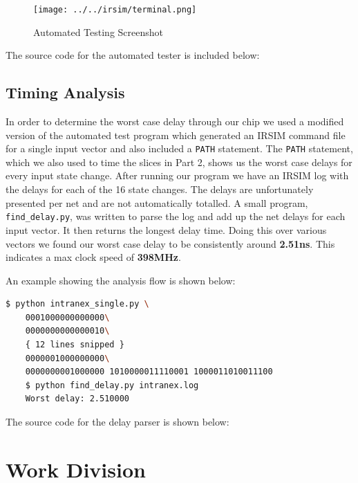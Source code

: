     \begin{figure}[H]
        \centering
        \texttt{[image: ../../irsim/terminal.png]}
        \caption{Automated Testing Screenshot}
    \end{figure}

    \newpage
    The source code for the automated tester is included below:

    

    \newpage
    \subsection{Timing Analysis}

    In order to determine the worst case delay through our chip we used a
    modified version of the automated test program which generated an IRSIM
    command file for a single input vector and also included a \texttt{PATH}
    statement. The \texttt{PATH} statement, which we also used to time the
    slices in Part 2, shows us the worst case delays for every input state
    change. After running our program we have an IRSIM log with the delays for
    each of the 16 state changes. The delays are unfortunately presented per net
    and are not automatically totalled. A small program, \texttt{find\_delay.py},
    was written to parse the log and add up the net delays for each input vector.
    It then returns the longest delay time. Doing this over various vectors we
    found our worst case delay to be consistently around \textbf{2.51ns}. This
    indicates a max clock speed of \textbf{398MHz}.

    An example showing the analysis flow is shown below:
    \begin{lstlisting}[language=bash]
    $ python intranex_single.py \
    0001000000000000\
    0000000000000010\
    { 12 lines snipped }
    0000001000000000\
    0000000001000000 1010000011110001 1000011010011100
    $ python find_delay.py intranex.log
    Worst delay: 2.510000
    \end{lstlisting}

    The source code for the delay parser is shown below:
    

    \section{Work Division}

